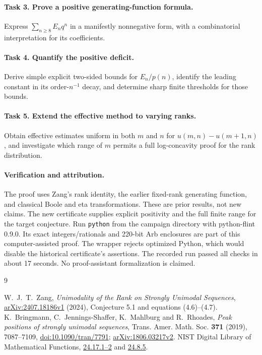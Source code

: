 \documentclass[11pt]{article}
\begin{document}
\paragraph{Task 3. Prove a positive generating-function formula.}
Express \(\sum_{n\geq8}E_nq^n\) in a manifestly nonnegative form,
with a combinatorial interpretation for its coefficients.

\paragraph{Task 4. Quantify the positive deficit.}
Derive simple explicit two-sided bounds for \(E_n/p(n)\), identify
the leading constant in its order-\(n^{-1}\) decay, and determine sharp
finite thresholds for those bounds.

\paragraph{Task 5. Extend the effective method to varying ranks.}
Obtain effective estimates uniform in both \(m\) and \(n\) for
\(u(m,n)-u(m+1,n)\), and investigate which range of \(m\) permits a
full log-concavity proof for the rank distribution.

\paragraph{Verification and attribution.}
The proof uses Zang's rank identity, the earlier fixed-rank generating
function, and classical Boole and eta transformations. These are prior
results, not new claims. The new certificate supplies explicit positivity
and the full finite range for the target conjecture.
Run \texttt{python}  from the campaign directory
with python-flint 0.9.0. Its exact integers/rationals and 220-bit Arb
enclosures are part of this computer-assisted proof. The wrapper rejects
optimized Python, which would disable the historical certificate's assertions.
The recorded run passed all checks in about 17 seconds. No proof-assistant
formalization is claimed.

\begin{thebibliography}{9}
\raggedright
{}
W.~J.~T.~Zang, \emph{Unimodality of the Rank on Strongly Unimodal Sequences},
\href{https://arxiv.org/abs/2407.18186}{arXiv:2407.18186v1} (2024),
Conjecture 5.1 and equations (4.6)--(4.7).
K.~Bringmann, C.~Jennings-Shaffer, K.~Mahlburg and R.~Rhoades,
\emph{Peak positions of strongly unimodal sequences},
Trans. Amer. Math. Soc. \textbf{371} (2019), 7087--7109,
\href{https://doi.org/10.1090/tran/7791}{doi:10.1090/tran/7791};
\href{https://arxiv.org/abs/1806.03217}{arXiv:1806.03217v2}.
NIST Digital Library of Mathematical Functions,
\href{https://dlmf.nist.gov/24.17}{24.17.1--2} and
\href{https://dlmf.nist.gov/24.8.E5}{24.8.5}.
\end{thebibliography}
\end{document}
